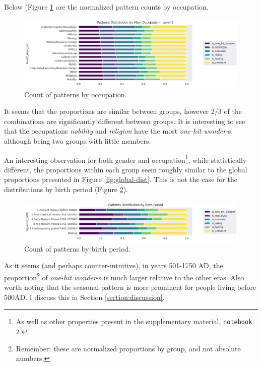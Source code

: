 \documentclass[titlepage]{article}
\newcommand{\ohw}{\textit{one-hit wonder}\xspace}
\begin{document}
Below (Figure \ref{fig:occupation} are the normalized pattern counts by occupation.

\begin{figure}[H]
    \centering
    \includegraphics[width=\linewidth]{figures/occupation_2.png}
    \caption{Count of patterns by occupation.}
    \label{fig:occupation}
\end{figure}

It seems that the proportions are similar between groups, however 2/3 of the combinations are significantly different between groups. It is interesting to see that the occupations \textit{nobility} and \textit{religion} have the most \ohw-s, although being two groups with little members.

An interesting observation for both gender and occupation\footnote{As well as other properties present in the supplementary material, \texttt{notebook 2}.}, while statistically different, the proportions within each group seem roughly similar to the global proportions presented in Figure \ref{fig:global-dist}. This is not the case for the distributions by birth period (Figure \ref{fig:birth-period}).

\begin{figure}[H]
    \centering
    \includegraphics[width=\linewidth]{figures/birth_period.png}
    \caption{Count of patterns by birth period.}
    \label{fig:birth-period}
\end{figure}

As it seems (and perhaps counter-intuitive), in years 501-1750 AD, the proportion\footnote{Remember: these are normalized proportions by group, and not absolute numbers.} of \ohw-s is much larger relative to the other eras. Also worth noting that the seasonal pattern is more prominent for people living before 500AD. I discuss this in Section \ref{section:discussion}.
\end{document}
